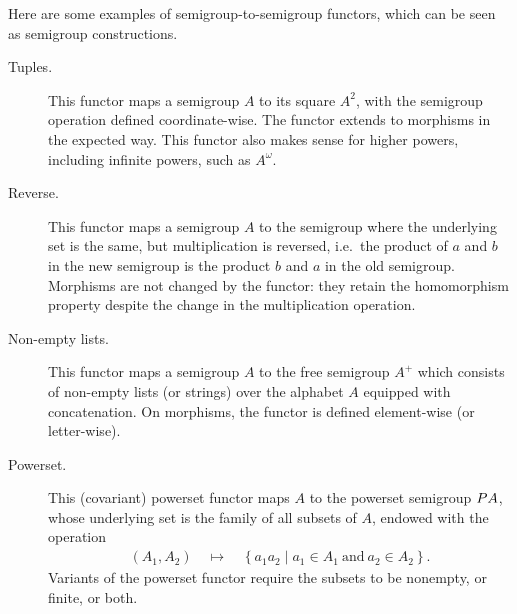  \begin{example}\label{ex:functors}
    Here are some examples of semigroup-to-semigroup functors, which  can be seen as semigroup constructions.   
    \begin{description}
        \item[Tuples.] This functor maps a semigroup $A$ to its square $A^2$, with the semigroup operation  defined coordinate-wise. The functor extends to morphisms in the expected way. This functor also makes sense for higher powers, including infinite powers, such as $A^\omega$.
        \item[Reverse.] This functor maps a semigroup $A$ to the semigroup where the underlying set is the same, but multiplication is reversed, i.e.~the product of $a$ and $b$ in the new semigroup is the product $b$ and $a$ in the old semigroup. Morphisms are not changed by the functor: they retain the homomorphism property despite the change in the multiplication operation.
        \item[Non-empty lists.] This functor maps a semigroup $A$ to the free semigroup $A^+$ which consists of non-empty lists (or strings) over the alphabet $A$ equipped with concatenation. On morphisms, the functor is defined element-wise (or letter-wise). 
        \item[Powerset.] This (covariant) powerset functor maps $A$ to the powerset semigroup $\powerset A$, whose underlying set is the family of all subsets of $A$, endowed with the operation
        \begin{align*}
        (A_1,A_2) \quad \mapsto \quad \left\{a_1 a_2 \mid a_1 \in A_1\ \text{and}\ a_2 \in A_2\right\}.
        \end{align*}
        Variants of the powerset   functor  require the subsets to be nonempty, or finite, or both.
    \end{description}
 \end{example}

